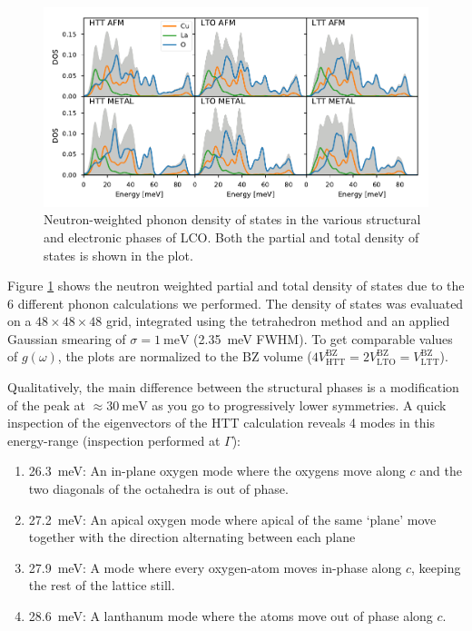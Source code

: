 \begin{figure}
	\centering
	\includegraphics[width=\textwidth]{fig/simulation/phonopy_pdos.pdf}
	\caption[Neutron DOS (frozen-phonons)]{Neutron-weighted phonon density of states in the various structural and electronic phases of LCO. Both the partial and total density of states is shown in the plot.}
	\label{fig:dos_all}
\end{figure}

Figure \ref{fig:dos_all} shows the neutron weighted partial and total density of states due to the 6 different phonon calculations we performed. The density of states was evaluated on a $48 \times 48 \times 48$ grid, integrated using the tetrahedron method and an applied Gaussian smearing of $\sigma=\SI{1}{\milli\eV}$ (\SI{2.35}{\milli\eV} FWHM). To get comparable values of $g(\omega)$, the plots are normalized to the BZ volume ($4V^\text{BZ}_\text{HTT} = 2 V^\text{BZ}_\text{LTO} = V^\text{BZ}_\text{LTT}$).

Qualitatively, the main difference between the structural phases is a modification of the peak at $\approx \SI{30}{\milli\eV}$ as you go to progressively lower symmetries. A quick inspection of the eigenvectors of the HTT calculation reveals 4 modes in this energy-range (inspection performed at $\Gamma$):

\begin{enumerate}
	\item \SI{26.3}{\milli\eV}: An in-plane oxygen mode where the oxygens move along $c$ and the two diagonals of the octahedra is out of phase.
	\item \SI{27.2}{\milli\eV}: An apical oxygen mode where apical of the same `plane' move together with the direction alternating between each plane
	\item \SI{27.9}{\milli\eV}: A mode where every oxygen-atom moves in-phase along $c$, keeping the rest of the lattice still.
	\item \SI{28.6}{\milli\eV}: A lanthanum mode where the atoms move out of phase along $c$.
\end{enumerate}

